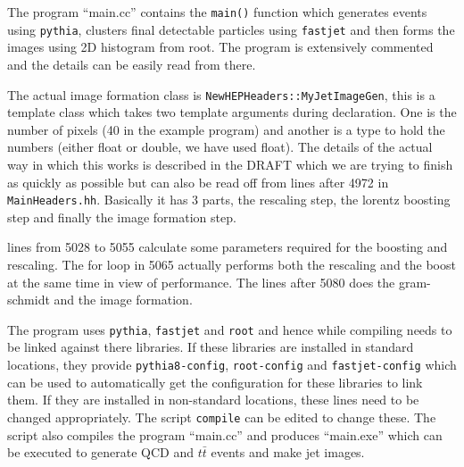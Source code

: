 

The program ``main.cc'' contains the {\tt main()} function which generates events using {\tt pythia}, clusters final detectable particles using {\tt fastjet} and then forms the images using 2D histogram from root.
The program is extensively commented and the details can be easily read from there.

The actual image formation class is {\tt NewHEPHeaders::MyJetImageGen}, this is a template class which takes two template arguments during declaration.
One is the number of pixels (40 in the example program) and another is a type to hold the numbers (either float or double, we have used float).
The details of the actual way in which this works is described in the DRAFT which we are trying to finish as quickly as possible but can also be read off from lines after 4972 in {\tt MainHeaders.hh}.
Basically it has 3 parts, the rescaling step, the lorentz boosting step and finally the image formation step.

lines from 5028 to 5055 calculate some parameters required for the boosting and rescaling.
The for loop in 5065 actually performs both the rescaling and the boost at the same time in view of performance.
The lines after 5080 does the gram-schmidt and the image formation.

The program uses {\tt pythia}, {\tt fastjet} and {\tt root} and hence while compiling needs to be linked against there libraries.
If these libraries are installed in standard locations, they provide {\tt pythia8-config}, {\tt root-config} and {\tt fastjet-config} which can be used to automatically get the configuration for these libraries to link them.
If they are installed in non-standard locations, these lines need to be changed appropriately.
The script {\tt compile} can be edited to change these. The script also compiles the program ``main.cc'' and produces ``main.exe'' which can be executed to generate QCD and $t \bar{t}$ events and make jet images.


